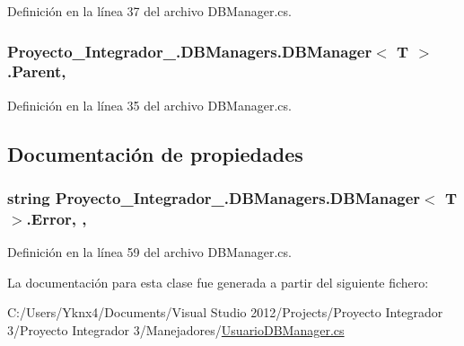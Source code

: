 Definición en la línea 37 del archivo D\-B\-Manager.\-cs.

\hypertarget{class_proyecto___integrador__3_1_1_d_b_managers_1_1_d_b_manager_3_01_t_01_4_a06315e75298c8f2fd46f32dc7c9a80b2}{
\subsubsection[{Parent}]{ Proyecto\-\_\-\-Integrador\-\_.\-D\-B\-Managers.\-D\-B\-Manager$<$ T $>$.Parent\hspace{0.3cm}{\ttfamily [protected]}, {\ttfamily [inherited]}}}\label{class_proyecto___integrador__3_1_1_d_b_managers_1_1_d_b_manager_3_01_t_01_4_a06315e75298c8f2fd46f32dc7c9a80b2}


Definición en la línea 35 del archivo D\-B\-Manager.\-cs.



\subsection{Documentación de propiedades}
\hypertarget{class_proyecto___integrador__3_1_1_d_b_managers_1_1_d_b_manager_3_01_t_01_4_a6e5caaed2ee1a4d067dfbf5aaa1b1fa8}{
\subsubsection[{Error}]{\setlength{\rightskip}{0pt plus 5cm}string Proyecto\-\_\-\-Integrador\-\_.\-D\-B\-Managers.\-D\-B\-Manager$<$ T $>$.Error\hspace{0.3cm}{\ttfamily [get]}, {\ttfamily [set]}, {\ttfamily [inherited]}}}\label{class_proyecto___integrador__3_1_1_d_b_managers_1_1_d_b_manager_3_01_t_01_4_a6e5caaed2ee1a4d067dfbf5aaa1b1fa8}


Definición en la línea 59 del archivo D\-B\-Manager.\-cs.



La documentación para esta clase fue generada a partir del siguiente fichero\-:\begin{DoxyCompactItemize}
\item 
C\-:/\-Users/\-Yknx4/\-Documents/\-Visual Studio 2012/\-Projects/\-Proyecto Integrador 3/\-Proyecto Integrador 3/\-Manejadores/\hyperlink{_usuario_d_b_manager_8cs}{Usuario\-D\-B\-Manager.\-cs}\end{DoxyCompactItemize}
